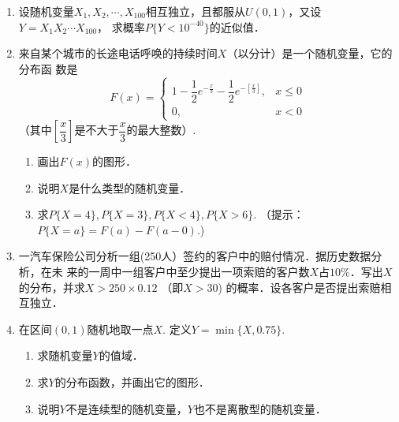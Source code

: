 \documentclass[10pt,a4paper]{article}
\begin{document}
\begin{enumerate}
    \item 设随机变量$X_1,X_2,\cdots,X_{100}$相互独立，且都服从$U(0,1)$，又设$Y=X_1X_2 \cdots X_{100}$，
    求概率$P\{Y<10^{-40}\}$的近似值．
    \clearpage


    \item 来自某个城市的长途电话呼唤的持续时间$X$（以分计）是一个随机变量，它的分布函
    数是
    $$F(x)=\left\{\begin{array}{ll}
        1-\dfrac{1}{2}e^{-\frac{x}{3}}-\dfrac{1}{2}e^{-[\frac{x}{3}]}, & x\leq 0\\
        0, & x<0
    \end{array}\right.$$
    （其中$[\dfrac{x}{3}]$是不大于$\dfrac{x}{3}$的最大整数）.
    \begin{enumerate}
        \item 画出$F(x)$的图形．
        \item 说明$X$是什么类型的随机变量．
        \item 求$P\{X=4\},P\{X=3\},P\{X<4\},P\{X>6\}$. （提示：$P\{X=a\}=F(a)-F(a-0)$.)
    \end{enumerate}
    \clearpage



    \item 一汽车保险公司分析一组(250人）签约的客户中的赔付情况．据历史数据分析，在未
    来的一周中一组客户中至少提出一项索赔的客户数$X$占$10\%$．写出$X$的分布，并求$X>250\times 0.12$
   （即$X>30$) 的概率．设各客户是否提出索赔相互独立．
   \clearpage


   \item 在区间$(0,1)$随机地取一点$X$. 定义$Y=\min \{X,0.75\}$.
   \begin{enumerate}
       \item 求随机变量$Y$的值域．
       \item 求$Y$的分布函数，并画出它的图形．
       \item 说明$Y$不是连续型的随机变量，$Y$也不是离散型的随机变量．
   \end{enumerate}

    

    

  

\end{enumerate}
\end{document}
